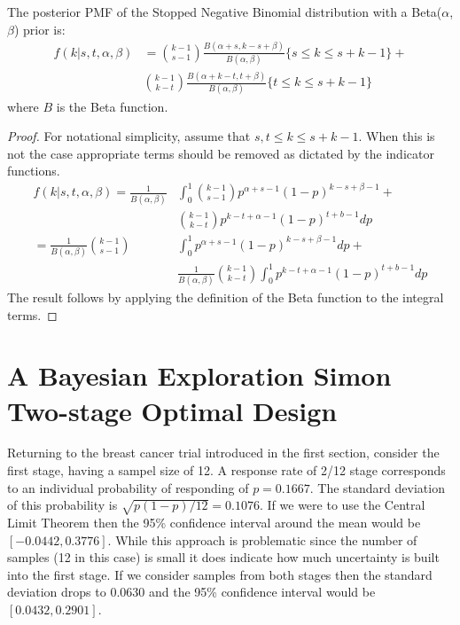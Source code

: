 \documentclass[12pt]{article}         %
\begin{document}
\begin{prop}
The posterior PMF of the Stopped Negative Binomial distribution with a Beta($\alpha$, $\beta$) prior is:
\begin{align}
f(k | s, t, \alpha, \beta) &= {k-1 \choose s-1} \frac{B\left(\alpha+s, k-s+\beta \right)}{B(\alpha, \beta)} \{s \leq k \leq s+k-1\} + \nonumber \\
& {k-1 \choose k-t} \frac{B\left(\alpha + k - t, t+\beta\right)}{B(\alpha, \beta)} \{t \leq k \leq s+k-1\}
\end{align}
where $B$ is the Beta function.
\end{prop}
\begin{proof}
For notational simplicity, assume that $s,t \leq k \leq s+k-1$. When this is not the case appropriate terms should be removed as dictated by the indicator functions.
\begin{align*}
f(k | s, t, \alpha, \beta) = \frac{1}{B(\alpha, \beta)} & \int_0^1 {k-1 \choose s-1} p^{\alpha +s -1} \left(1-p\right)^{k-s+\beta-1} + \\
 & {k-1 \choose k-t} p^{k-t+\alpha-1}\left(1-p\right)^{t+b-1} dp \\
= \frac{1}{B(\alpha, \beta)}  {k-1 \choose s-1} & \int_0^1  p^{\alpha +s -1} \left(1-p\right)^{k-s+\beta-1} dp + \\
 & \frac{1}{B(\alpha, \beta)} {k-1 \choose k-t} \int_0^1  p^{k-t+\alpha-1}\left(1-p\right)^{t+b-1} dp
\end{align*}
The result follows by applying the definition of the Beta function to the integral terms.
\end{proof}

\section{A Bayesian Exploration Simon Two-stage Optimal Design}

Returning to the breast cancer trial introduced in the first section, consider
the first stage, having a sampel size of 12. A
response rate of 2/12 stage corresponds to an individual 
probability of responding of $p=0.1667$. The standard deviation of this 
probability is $\sqrt{p(1-p)/12}=0.1076$. If we were to use the Central 
Limit Theorem then the 95\% confidence interval around the mean would 
be $[-0.0442, 0.3776]$. While this approach is problematic since the number 
of samples (12 in this case) is small it does indicate how much uncertainty 
is built into the first stage. If we consider samples from both stages then 
the standard deviation drops to 0.0630 and the 95\% confidence interval 
would be $[0.0432, 0.2901]$.
\end{document}

